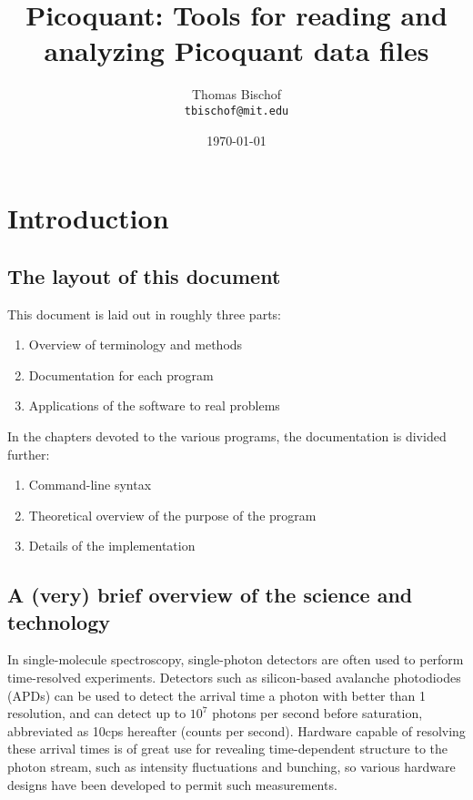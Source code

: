 \documentclass{article}
\title{Picoquant: Tools for reading and analyzing Picoquant data files}
\author{Thomas Bischof \\ \texttt{tbischof@mit.edu}}
\date{\today}
\newcommand{\cps}{cps}
\begin{document}
\maketitle
\tableofcontents
 
\section{Introduction}
\subsection{The layout of this document}
This document is laid out in roughly three parts:
\begin{enumerate}
\item Overview of terminology and methods
\item Documentation for each program
\item Applications of the software to real problems
\end{enumerate}
In the chapters devoted to the various programs, the documentation is divided further:
\begin{enumerate}
\item Command-line syntax
\item Theoretical overview of the purpose of the program
\item Details of the implementation
\end{enumerate}

\subsection{A (very) brief overview of the science and technology}
In single-molecule spectroscopy, single-photon detectors are often used to perform time-resolved experiments. Detectors such as silicon-based avalanche photodiodes (APDs) can be used to detect the arrival time a photon with better than 1\nano\second{} resolution, and can detect up to $10^{7}$ photons per second before saturation, abbreviated as 10\mega\cps{} hereafter (counts per second). Hardware capable of resolving these arrival times is of great use for revealing time-dependent structure to the photon stream, such as intensity fluctuations and bunching, so various hardware designs have been developed to permit such measurements.
\end{document}

